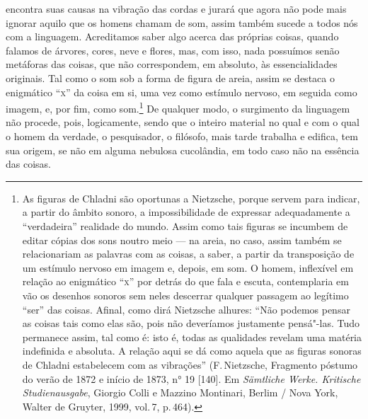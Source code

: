 encontra suas causas na vibração
das cordas e jurará que agora não pode mais ignorar aquilo que os
homens chamam de som, assim também sucede a todos nós com a
linguagem. Acreditamos saber algo acerca das próprias coisas, quando
falamos de árvores, cores, neve e flores, mas, com isso, nada possuímos
senão metáforas das coisas, que não correspondem, em absoluto, às
essencialidades originais. Tal como o som sob a forma de figura de
areia, assim se destaca o enigmático ``\textsc{x}'' da coisa em si, uma vez como
estímulo nervoso, em seguida como imagem, e, por fim, como
som.\footnote{ As figuras de Chladni são oportunas a Nietzsche, porque
servem para indicar, a partir do âmbito sonoro, a impossibilidade de
expressar adequadamente a “verdadeira” realidade do mundo. Assim como
tais figuras se incumbem de editar cópias dos sons noutro meio --- na
areia, no caso, assim também se relacionariam as palavras com as
coisas, a saber, a partir da transposição de um estímulo nervoso em
imagem e, depois, em som. O homem, inflexível em relação ao enigmático
“\textsc{x}” por detrás do que fala e escuta, contemplaria em vão os desenhos
sonoros sem neles descerrar qualquer passagem ao legítimo “ser” das
coisas. Afinal, como dirá Nietzsche alhures: “Não podemos pensar as coisas
tais como elas são, pois não deveríamos justamente pensá"-las. Tudo
permanece assim, tal como é: isto é, todas as qualidades revelam uma
matéria indefinida e absoluta. A relação aqui se dá como aquela que
as figuras sonoras de Chladni estabelecem com as vibrações” (F.\,Nietzsche,
Fragmento póstumo do verão de 1872 e início de 1873, n° 19 [140].
Em \textit{Sämtliche Werke. Kritische Studienausgabe}, Giorgio
Colli e Mazzino Montinari, Berlim / Nova York, Walter de Gruyter, 1999,
vol.\,7, p.\,464).} De qualquer modo, o surgimento da linguagem não
procede, pois, logicamente, sendo que o inteiro material no qual e com
o qual o homem da verdade, o pesquisador, o filósofo, mais tarde
trabalha e edifica, tem sua origem, se não em alguma nebulosa
cucolândia, em todo caso não na essência das coisas.


